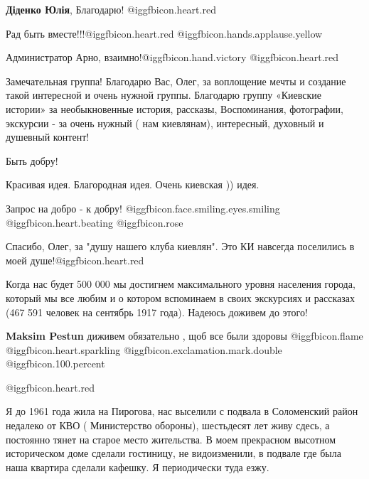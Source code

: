 \begin{itemize}
\begin{itemize} %
\textbf{Діденко Юлія}, Благодарю! @igg{fbicon.heart.red}
\end{itemize} %

Рад быть вместе!!!@igg{fbicon.heart.red} @igg{fbicon.hands.applause.yellow} 

\begin{itemize} %
Администратор
Арно, взаимно!@igg{fbicon.hand.victory} @igg{fbicon.heart.red}
\end{itemize} %


Замечательная группа! Благодарю Вас, Олег, за воплощение мечты и создание такой
интересной и очень нужной группы. Благодарю группу «Киевские истории» за
необыкновенные история, рассказы, Воспоминания, фотографии, экскурсии - за
очень нужный ( нам киевлянам), интересный, духовный и душевный контент!

Быть добру!


Красивая идея. Благородная идея. Очень киевская )) идея.

Запрос на добро - к добру!  @igg{fbicon.face.smiling.eyes.smiling}  @igg{fbicon.heart.beating}  @igg{fbicon.rose} 

Спасибо, Олег, за "душу нашего клуба киевлян". Это КИ навсегда поселились в моей душе!@igg{fbicon.heart.red}


Когда нас будет 500 000 мы достигнем максимального уровня населения города,
который мы все любим и о котором вспоминаем в своих экскурсиях и рассказах (467
591 человек на сентябрь 1917 года). Надеюсь доживем до этого!

\begin{itemize} %
\textbf{Maksim Pestun} диживем обязательно , щоб все были здоровы  @igg{fbicon.flame}  @igg{fbicon.heart.sparkling} @igg{fbicon.exclamation.mark.double}  @igg{fbicon.100.percent} 
\end{itemize} %


@igg{fbicon.heart.red}


Я до 1961 года жила на Пирогова, нас выселили с подвала в Соломенский район
недалеко от КВО ( Министерство обороны), шестьдесят лет живу сдесь, а постоянно
тянет на старое место жительства. В моем прекрасном высотном историческом доме
сделали гостиницу, не видоизменили, в подвале где была наша квартира сделали
кафешку. Я периодически туда езжу.


\end{itemize}
